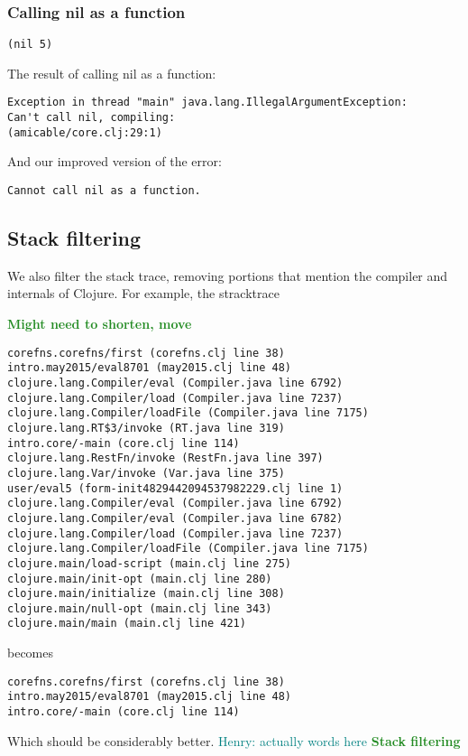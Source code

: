 \documentclass[submission,copyright,creativecommons]{eptcs}
\newcommand{\allcomments}[1]{{#1}}
\newcommand{\emcomment}[1]{{\bf \textcolor{ForestGreen}{\allcomments{{#1}}}}}
\newcommand{\hfcomment}[1]{\textcolor{Teal}{\allcomments{Henry: {#1}}}}
\begin{document}
\subsubsection{Calling nil as a function}
{\tt (nil 5)}

The result of calling nil as a function:
\begin{verbatim}
Exception in thread "main" java.lang.IllegalArgumentException:
Can't call nil, compiling:
(amicable/core.clj:29:1)
\end{verbatim}
And our improved version of the error:
\begin{verbatim}
Cannot call nil as a function.
\end{verbatim}

\subsection{Stack filtering}
We also filter the stack trace, removing portions that mention the compiler and internals of Clojure. For example, the stracktrace 

\emcomment{Might need to shorten, move}

\begin{verbatim}
corefns.corefns/first (corefns.clj line 38)
intro.may2015/eval8701 (may2015.clj line 48)
clojure.lang.Compiler/eval (Compiler.java line 6792)
clojure.lang.Compiler/load (Compiler.java line 7237)
clojure.lang.Compiler/loadFile (Compiler.java line 7175)
clojure.lang.RT$3/invoke (RT.java line 319)
intro.core/-main (core.clj line 114)
clojure.lang.RestFn/invoke (RestFn.java line 397)
clojure.lang.Var/invoke (Var.java line 375)
user/eval5 (form-init4829442094537982229.clj line 1)
clojure.lang.Compiler/eval (Compiler.java line 6792)
clojure.lang.Compiler/eval (Compiler.java line 6782)
clojure.lang.Compiler/load (Compiler.java line 7237)
clojure.lang.Compiler/loadFile (Compiler.java line 7175)
clojure.main/load-script (main.clj line 275)
clojure.main/init-opt (main.clj line 280)
clojure.main/initialize (main.clj line 308)
clojure.main/null-opt (main.clj line 343)
clojure.main/main (main.clj line 421)
\end{verbatim}
 
becomes 

\begin{verbatim}
corefns.corefns/first (corefns.clj line 38)
intro.may2015/eval8701 (may2015.clj line 48)
intro.core/-main (core.clj line 114)
\end{verbatim} 
 
Which should be considerably better.
\hfcomment{actually words here}
\emcomment{Stack filtering}
\end{document}
